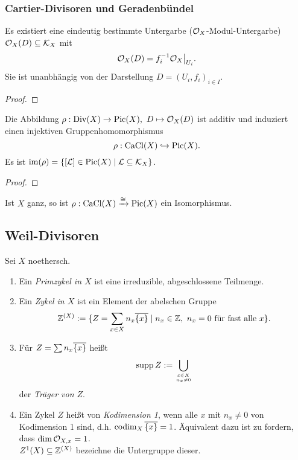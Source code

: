 \subsubsection{Cartier-Divisoren und Geradenbündel}

\begin{lemma}
    Es existiert eine eindeutig bestimmte Untergarbe ($\mathcal{O}_X$-Modul-Untergarbe)
    $\mathcal{O}_X(D) \subseteq \mathcal K_X$
    mit \[\mathcal{O}_X(D) = f_i^{-1} \mathcal{O}_X\big|_{U_i}.\]
    Sie ist unanbhängig von der Darstellung $D = (U_i,f_i)_{i\in I}$.
\end{lemma}
\begin{proof}
\TODO
\end{proof}

\begin{satz}
    Die Abbildung $\rho: \operatorname{Div}(X) \to\operatorname{Pic}(X),\ D \mapsto \mathcal{O}_X(D)$ ist additiv
    und induziert einen injektiven Gruppenhomomorphismus
    \[ \rho: \operatorname{CaCl}(X) \hookrightarrow \operatorname{Pic}(X).\]
    Es ist $\operatorname{im}(\rho) = \{[\mathcal{L}] \in \operatorname{Pic}(X) \mid \mathcal{L} \subseteq \mathcal K_X\}$.
\end{satz}
\begin{proof}
\TODO
\end{proof}

\begin{satz}
    Ist $X$ ganz, so ist $\rho: \operatorname{CaCl}(X) \xrightarrow{\cong} \operatorname{Pic}(X)$ ein 
    Isomorphismus.
\end{satz}

\subsection{Weil-Divisoren}

\begin{definition}
    Sei $X$ noethersch.
    \begin{enumerate}[label=(\roman*)]
      \item Ein \emph{Primzykel in $X$} ist eine irreduzible, abgeschlossene
        Teilmenge.
      \item Ein \emph{Zykel in $X$} ist ein Element der abelschen Gruppe
        \[\mathbb{Z}^{(X)} := \{Z = \sum_{x\in X} n_x \overline{\{x\}} \mid
            n_x \in \mathbb{Z},\ n_x = 0\text{ für fast alle }x\}.\]
      \item Für $Z = \sum n_x \overline{\{x\}}$ heißt
        \[ \operatorname{supp} Z := \bigcup_{x\in X\atop n_x\neq 0}\]
        der \emph{Träger von $Z$}.
      \item Ein Zykel $Z$ heißt von \emph{Kodimension 1}, wenn alle $x$ mit
        $n_x \neq 0$ von Kodimension 1 sind, d.h. 
        $\operatorname{codim}_X \overline{\{x\}} = 1$. Äquivalent dazu ist zu fordern, dass
        $\dim \mathcal{O}_{X,x} = 1$.\\
        $Z^1(X) \subseteq \mathbb{Z}^{(X)}$ bezeichne die Untergruppe dieser.
    \end{enumerate}
\end{definition}

